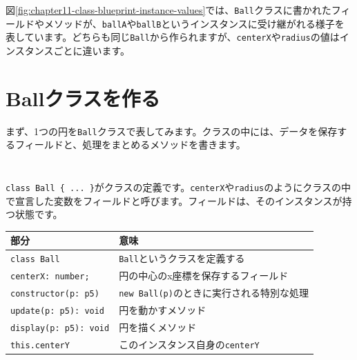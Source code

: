 図\ref{fig:chapter11-class-blueprint-instance-values}では、\texttt{Ball}クラスに書かれたフィールドやメソッドが、\texttt{ballA}や\texttt{ballB}というインスタンスに受け継がれる様子を表しています。どちらも同じ\texttt{Ball}から作られますが、\texttt{centerX}や\texttt{radius}の値はインスタンスごとに違います。

\section{Ballクラスを作る}

まず、1つの円を\texttt{Ball}クラスで表してみます。クラスの中には、データを保存するフィールドと、処理をまとめるメソッドを書きます。

\begin{listing}[htbp]
\inputminted[firstline=1,lastline=36]{ts}{typescript-p5/listings/chapter11/ball-class-single.ts}
\caption{Ballクラスの定義（\texttt{chapter11/ball-class-single.ts}）}
\label{lst:chapter11-ball-class-single-class}
\end{listing}

\begin{listing}[htbp]
\inputminted[firstline=38,lastline=55]{ts}{typescript-p5/listings/chapter11/ball-class-single.ts}
\caption{Ballクラスを使って1つの円を動かす（\texttt{chapter11/ball-class-single.ts}）}
\label{lst:chapter11-ball-class-single-sketch}
\end{listing}

\texttt{class Ball \{ ... \}}がクラスの定義です。\texttt{centerX}や\texttt{radius}のようにクラスの中で宣言した変数をフィールドと呼びます。フィールドは、そのインスタンスが持つ状態です。

\begin{center}
\begin{tabular}{ll}
\toprule
部分 & 意味 \\
\midrule
\texttt{class Ball} & \texttt{Ball}というクラスを定義する \\
\texttt{centerX: number;} & 円の中心のx座標を保存するフィールド \\
\texttt{constructor(p: p5)} & \texttt{new Ball(p)}のときに実行される特別な処理 \\
\texttt{update(p: p5): void} & 円を動かすメソッド \\
\texttt{display(p: p5): void} & 円を描くメソッド \\
\texttt{this.centerY} & このインスタンス自身の\texttt{centerY} \\
\bottomrule
\end{tabular}
\end{center}

